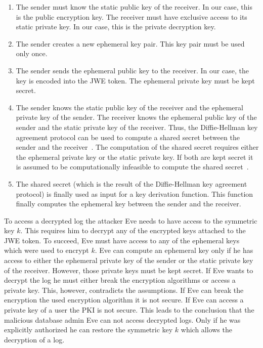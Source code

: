 \documentclass[../main.tex]{subfiles}
\begin{document}
\begin{enumerate}
    \item 
    The sender must know the static public key of the receiver. 
    In our case, this is the public encryption key.
    The receiver must have exclusive access to its static private key.
    In our case, this is the private decryption key.
    \item 
    The sender creates a new ephemeral key pair. 
    This key pair must be used only once.
    \item 
    The sender sends the ephemeral public key to the receiver.
    In our case, the key is encoded into the JWE token.
    The ephemeral private key must be kept secret.
    \item 
    The sender knows the static public key of the receiver and the ephemeral private key of the sender.
    The receiver knows the ephemeral public key of the sender and the static private key of the receiver.
    Thus, the Diffie-Hellman key agreement protocol can be used to compute a shared secret between the sender and the receiver~\cite[section 9.3.6]{Eckert2018}.
    The computation of the shared secret requires either the ephemeral private key or the static private key.
    If both are kept secret it is assumed to be computationally infeasible to compute the shared secret~\cite[section 9.3.6]{Eckert2018}.
    \item 
    The shared secret (which is the result of the Diffie-Hellman key agreement protocol) is finally used as input for a key derivation function.
    This function finally computes the ephemeral key between the sender and the receiver.
\end{enumerate}

To access a decrypted log the attacker Eve needs to have access to the symmetric key $k$.
This requires him to decrypt any of the encrypted keys attached to the JWE token.
To succeed, Eve must have access to any of the ephemeral keys which were used to encrypt $k$.
Eve can compute an ephemeral key only if he has access to either the ephemeral private key of the sender or the static private key of the receiver.
However, those private keys must be kept secret.
If Eve wants to decrypt the log he must either break the encryption algorithms or access a private key.
This, however, contradicts the assumptions.
If Eve can break the encryption the used encryption algorithm it is not secure.
If Eve can access a private key of a user the PKI is not secure.
This leads to the conclusion that the malicious database admin Eve can not access decrypted logs.
Only if he was explicitly authorized he can restore the symmetric key $k$ which allows the decryption of a log.
\end{document}
